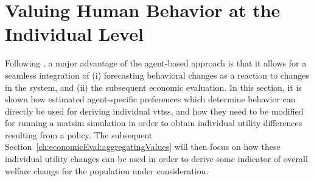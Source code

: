 





\section{Valuing Human Behavior at the Individual Level}
\label{ch:economicEval:valuingBehavior}
Following \citet{deJongEtAl2007LogsumTRA}, a major advantage of the agent-based approach is that it allows for a seamless integration of (i) forecasting behavioral changes as a reaction to changes in the system, and (ii) the subsequent economic evaluation.
%
In this section, it is shown how estimated agent-specific preferences which determine behavior can directly be used for deriving individual \glspl{vtts}, and how they need to be modified for running a \gls{matsim} simulation in order to obtain individual utility differences resulting from a policy.
%
The subsequent Section~\ref{ch:economicEval:aggregatingValues} will then focus on how these individual utility changes can be used in order to derive some indicator of overall welfare change for the population under consideration.

